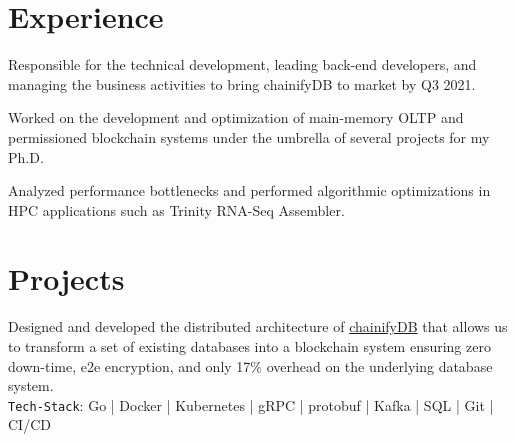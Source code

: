 \documentclass[]{deedy-resume-openfont}
\begin{document}
\begin{minipage}[t]{0.67\textwidth}
	

\section{Experience}

Responsible for the technical development, leading back-end developers, and managing the business activities to bring chainifyDB to market by Q3 2021.

\sectionsep

Worked on the development and optimization of main-memory OLTP and permissioned blockchain systems under the umbrella of several projects for my Ph.D.

\sectionsep
{}
Analyzed performance bottlenecks and performed algorithmic optimizations in HPC applications such as Trinity RNA-Seq Assembler.

\sectionsep



\section{Projects}
Designed and developed the distributed architecture of \href{www.chainifydb.com}{chainifyDB} that allows us to transform a set of existing databases into a 
blockchain system ensuring zero down-time, e2e encryption, and only 17\% overhead on the underlying database system.\\
\texttt{Tech-Stack}: Go | Docker | Kubernetes | gRPC | protobuf | Kafka | SQL | Git | CI/CD


\end{minipage}
\end{document}
